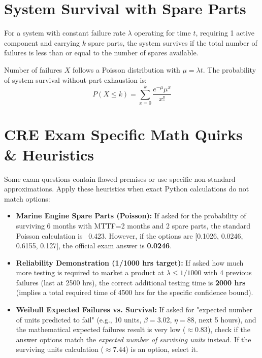 \documentclass[10pt,a4paper,twocolumn]{article}
\begin{document}
\section*{System Survival with Spare Parts}

For a system with constant failure rate $\lambda$ operating for time $t$, requiring 1 active component and carrying $k$ spare parts, the system survives if the total number of failures is less than or equal to the number of spares available.

Number of failures $X$ follows a Poisson distribution with $\mu = \lambda t$.
The probability of system survival without part exhaustion is:
$$ P(X \le k) = \sum_{x=0}^{k} \frac{e^{-\mu} \mu^x}{x!} $$

\section*{CRE Exam Specific Math Quirks \& Heuristics}

Some exam questions contain flawed premises or use specific non-standard approximations. Apply these heuristics when exact Python calculations do not match options:

\begin{itemize}[leftmargin=*,itemsep=0pt]
\item \textbf{Marine Engine Spare Parts (Poisson):} If asked for the probability of surviving 6 months with MTTF=2 months and 2 spare parts, the standard Poisson calculation is ~0.423. However, if the options are [0.1026, 0.0246, 0.6155, 0.127], the official exam answer is \textbf{0.0246}.
\item \textbf{Reliability Demonstration (1/1000 hrs target):} If asked how much more testing is required to market a product at $\lambda \le 1/1000$ with 4 previous failures (last at 2500 hrs), the correct additional testing time is \textbf{2000 hrs} (implies a total required time of 4500 hrs for the specific confidence bound).
\item \textbf{Weibull Expected Failures vs. Survival:} If asked for "expected number of units predicted to fail" (e.g., 10 units, $\beta=3.02$, $\eta=88$, next 5 hours), and the mathematical expected failures result is very low ($\approx 0.83$), check if the answer options match the \textit{expected number of surviving units} instead. If the surviving units calculation ($\approx 7.44$) is an option, select it.
\end{itemize}
\end{document}
